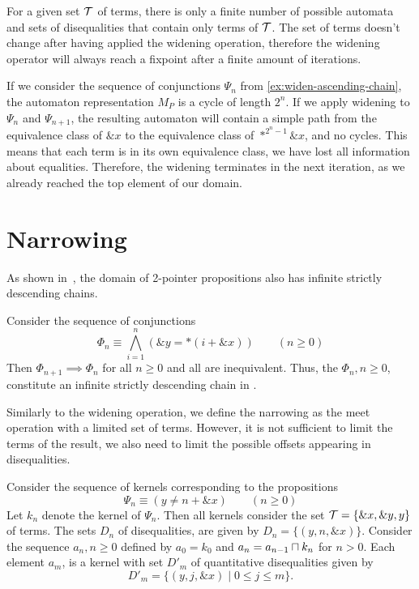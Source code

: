 For a given set $\mathcal{T}$ of terms, there is only a finite number of possible automata and sets of disequalities that contain only terms of $\mathcal{T}$.
The set of terms doesn't change after having applied the widening operation, therefore the widening operator will always reach a fixpoint after a finite amount of iterations.

\begin{example}\label{ex:widen}
  If we consider the sequence of conjunctions $\Psi_n$ from \cref{ex:widen-ascending-chain}, the automaton representation $M_P$ is a cycle of length $2^n$.
  If we apply widening to $\Psi_n$ and $\Psi_{n+1}$, the resulting automaton will contain a simple path from the equivalence class of $\&x$ to the equivalence class of $*^{2^{n}-1}\&x$,
  and no cycles.
  This means that each term is in its own equivalence class, we have lost all information about equalities.
  Therefore, the widening terminates in the next iteration,
  as we already reached the top element of our domain.
\end{example}

\section{Narrowing}

As shown in~\cite{2pointer}, the domain of 2-pointer propositions also has infinite strictly descending chains.

\begin{example}
	Consider the sequence of conjunctions
	\[
	\Phi_n \equiv\bigwedge_{i=1}^n (\&y = *(i+\&x))\qquad(n\geq 0)
	\]
	Then $\Phi_{n+1}\implies\Phi_n$ for all $n\geq 0$ and all are inequivalent.
	Thus, the $\Phi_n,n\geq 0$, constitute an infinite strictly descending chain in \cpo.
\end{example}

Similarly to the widening operation, we define the narrowing as the meet operation with a limited set of terms.
However, it is not sufficient to limit the terms of the result, we also need to limit the possible offsets
appearing in disequalities.\cite{new-paper-todo}

\begin{example}\label{e:narrow1}
	Consider the sequence of kernels corresponding to the propositions
	\[
	\Psi_n \equiv (y\neq n+\&x)\qquad(n\geq 0)
	\]
	Let $k_n$ denote the kernel of $\Psi_n$.
  Then all kernels consider the set $\mathcal{T}=\{\&x,\&y,y\}$ of terms.
	The sets $D_n$ of disequalities, are given by $D_n=\{(y,n,\&x)\}$.
  Consider the sequence $a_n, n\geq 0$ defined by $a_0 = k_0$ and $a_n = a_{n-1}\sqcap k_n$ for $n>0$.
  Each element $a_m$, is a kernel with set $D'_m$ of quantitative disequalities given by
	\[
	D'_m = \{(y,j,\&x)\mid 0\leq j\leq m\}.
	\]
\end{example}


